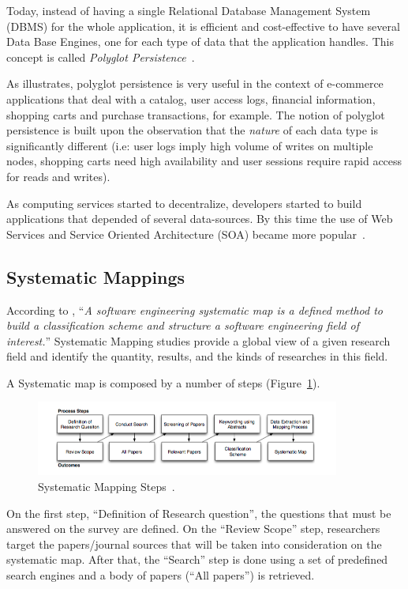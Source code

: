 \documentclass{article}
\begin{document}
Today, instead of having a single Relational Database Management System (DBMS) for the whole application, it is efficient and cost-effective to have several Data Base Engines, one for each type of data that the application handles. 
This concept is called \textit{Polyglot Persistence}~\cite{sadalage2012nosql}.

As \cite{AdressingDataManagementCloud} illustrates, polyglot persistence is very useful in the context of  e-commerce applications that deal with a catalog, user access logs, financial information, shopping carts and purchase transactions, for example.
The notion of polyglot persistence is built upon the observation that the \textit{nature} of each data type is significantly different (i.e: user logs imply high volume of writes on multiple nodes, shopping carts need high availability and user sessions require rapid access for reads and writes). 

As computing services started to decentralize, developers started to build applications that depended of several data-sources. 
By this time the use of Web Services and Service Oriented Architecture (SOA) became more popular~\cite{Armbrust09m.:above}. 


\subsection{Systematic Mappings}
According to \cite{Petersen:2008:SMS:2227115.2227123}, ``\textit{A software engineering systematic map is a defined method to build a classification scheme and structure a software engineering field of interest.}''
Systematic Mapping studies provide a global view of a given research field and identify the quantity, results, and the kinds of researches in this field.

A Systematic map is composed by a number of steps (Figure~\ref{fig:sms}).
\begin{figure}[ht!]
\centering
\includegraphics[width=100mm]{pic1.png}
\caption{Systematic Mapping Steps~\cite{Petersen:2008:SMS:2227115.2227123}.\label{fig:sms}}
\end{figure}

On the first step, ``Definition of Research question'', the questions that must be answered on the survey are defined. 
On the ``Review Scope'' step, researchers target the papers/journal sources that will be taken into consideration on the systematic map. 
After that, the ``Search'' step is done using a set of predefined search engines and a body of papers (``All papers'') is retrieved. 
\end{document}
